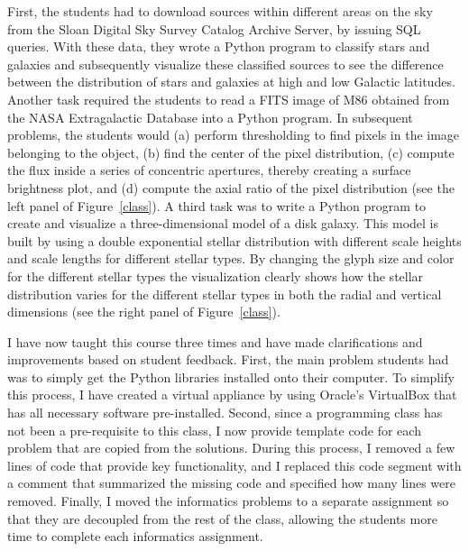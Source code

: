 First, the students had to download sources within different areas on the sky from the Sloan Digital Sky Survey Catalog Archive Server, by issuing SQL queries. With these data, they wrote a Python program to classify stars and galaxies and subsequently visualize these classified sources to see the difference between the distribution of stars and galaxies at high and low Galactic latitudes. Another task required the students to read a FITS image of M86 obtained from the NASA Extragalactic Database into a Python program. In subsequent problems, the students would (a) perform thresholding to find pixels in the image belonging to the object, (b) find the center of the pixel distribution, (c) compute the flux inside a series of concentric apertures, thereby creating a surface brightness plot, and (d) compute the axial ratio of the pixel distribution (see the left panel of Figure~\ref{class}). A third task was to write a Python program to create and visualize a three-dimensional model of a disk galaxy. This model is built by using a double exponential stellar distribution with different scale heights and scale lengths for different stellar types. By changing the glyph size and color for the different stellar types the visualization clearly shows how the stellar distribution varies for the different stellar types in both the radial and vertical dimensions (see the right panel of Figure~\ref{class}).

I have now taught this course three times and have made clarifications and improvements based on student feedback. First, the main problem students had was to simply get the Python libraries installed onto their computer. To simplify this process, I have created a virtual appliance by using Oracle's VirtualBox that has all necessary software pre-installed. Second, since a programming class has not been a pre-requisite to this class, I now provide template code for each problem that are copied from the solutions. During this process, I removed a few lines of code that provide key functionality, and I replaced this code segment with a comment that summarized the missing code and specified how many lines were removed. Finally, I moved the informatics problems to a separate assignment so that they are decoupled from the rest of the class, allowing the students more time to complete each informatics assignment.

